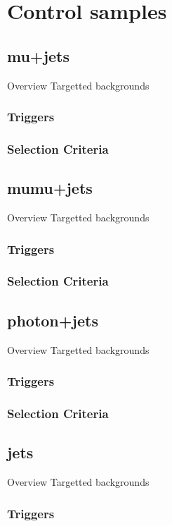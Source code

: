 \section{Control samples}  %
\label{sec:background_control}

\subsection{mu+jets}
Overview
Targetted backgrounds
\subsubsection{Triggers}
\subsubsection{Selection Criteria}

\subsection{mumu+jets}
Overview
Targetted backgrounds
\subsubsection{Triggers}
\subsubsection{Selection Criteria}

\subsection{photon+jets}
Overview
Targetted backgrounds
\subsubsection{Triggers}
\subsubsection{Selection Criteria}

\subsection{jets}
Overview
Targetted backgrounds
\subsubsection{Triggers}
